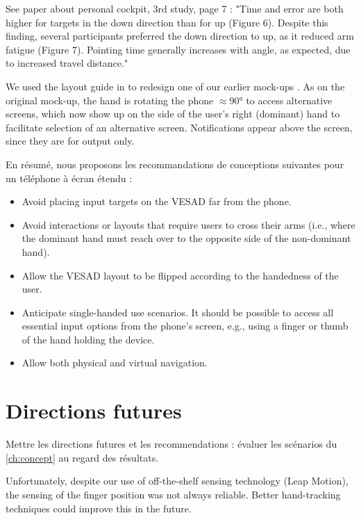 
See paper about personal cockpit, 3rd study, page 7 : "Time and error are both higher for targets in the down direction than for up (Figure 6). Despite this finding, several participants preferred the down direction to up, as it reduced arm fatigue (Figure 7). Pointing time generally increases with angle, as expected, due to increased travel distance."

We used the layout guide in  to redesign one of our earlier mock-ups . As on the original mock-up, the hand is rotating the phone $\approx$\ang{90} to access alternative screens, which now show up on the side of the user's right (dominant) hand to facilitate selection of an alternative screen. Notifications appear above the screen, since they are for output only.

En résumé, nous proposons les recommandations de conceptions suivantes pour un téléphone à écran étendu :
\begin{itemize}
  \item Avoid placing input targets on the VESAD far from the phone.
  \item Avoid interactions or layouts that require users to cross their arms (i.e., where the dominant hand must reach over to the opposite side of the non-dominant hand).
  \item Allow the VESAD layout to be flipped according to the handedness of the user.
  \item Anticipate single-handed use scenarios. It should be possible to access all essential input options from the phone's screen, e.g., using a finger or thumb of the hand holding the device.
  \item Allow both physical and virtual navigation.
\end{itemize}


\section{Directions futures}
\label{sec:future_work}

Mettre les directions futures et les recommendations : évaluer les scénarios du \autoref{ch:concept} au regard des résultats.

Unfortunately, despite our use of off-the-shelf sensing technology (Leap Motion), the sensing of the finger position was not always reliable. Better hand-tracking techniques \cite{Taylor2016} could improve this in the future.

